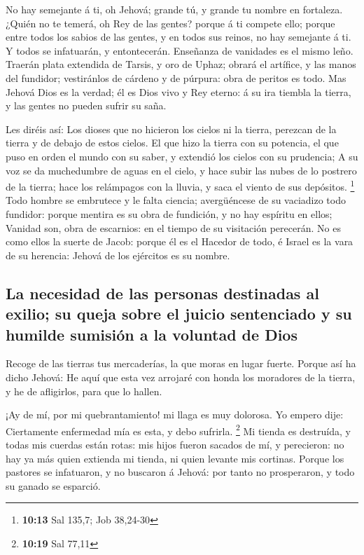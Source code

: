  No hay semejante á ti, oh Jehová; grande tú, y grande tu
nombre en fortaleza.  ¿Quién no te temerá, oh Rey de las
gentes? porque á ti compete ello; porque entre todos los sabios de las
gentes, y en todos sus reinos, no hay semejante á ti.  Y
todos se infatuarán, y entontecerán. Enseñanza de vanidades es el mismo
leño.  Traerán plata extendida de Tarsis, y oro de Uphaz;
obrará el artífice, y las manos del fundidor; vestiránlos de cárdeno y
de púrpura: obra de peritos es todo.  Mas Jehová Dios es la
verdad; él es Dios vivo y Rey eterno: á su ira tiembla la tierra, y las
gentes no pueden sufrir su saña.

 Les diréis así: Los dioses que no hicieron los cielos ni
la tierra, perezcan de la tierra y de debajo de estos cielos.
 El que hizo la tierra con su potencia, el que puso en
orden el mundo con su saber, y extendió los cielos con su prudencia;
 A su voz se da muchedumbre de aguas en el cielo, y hace
subir las nubes de lo postrero de la tierra; hace los relámpagos con la
lluvia, y saca el viento de sus depósitos. \footnote{\textbf{10:13} Sal
  135,7; Job 38,24-30}  Todo hombre se embrutece y le falta
ciencia; avergüéncese de su vaciadizo todo fundidor: porque mentira es
su obra de fundición, y no hay espíritu en ellos;  Vanidad
son, obra de escarnios: en el tiempo de su visitación perecerán.
 No es como ellos la suerte de Jacob: porque él es el
Hacedor de todo, é Israel es la vara de su herencia: Jehová de los
ejércitos es su nombre.

\hypertarget{la-necesidad-de-las-personas-destinadas-al-exilio-su-queja-sobre-el-juicio-sentenciado-y-su-humilde-sumisiuxf3n-a-la-voluntad-de-dios}{%
\subsection{La necesidad de las personas destinadas al exilio; su queja
sobre el juicio sentenciado y su humilde sumisión a la voluntad de
Dios}\label{la-necesidad-de-las-personas-destinadas-al-exilio-su-queja-sobre-el-juicio-sentenciado-y-su-humilde-sumisiuxf3n-a-la-voluntad-de-dios}}

 Recoge de las tierras tus mercaderías, la que moras en
lugar fuerte.  Porque así ha dicho Jehová: He aquí que esta
vez arrojaré con honda los moradores de la tierra, y he de afligirlos,
para que lo hallen.

 ¡Ay de mí, por mi quebrantamiento! mi llaga es muy
dolorosa. Yo empero dije: Ciertamente enfermedad mía es esta, y debo
sufrirla. \footnote{\textbf{10:19} Sal 77,11}  Mi tienda es
destruída, y todas mis cuerdas están rotas: mis hijos fueron sacados de
mí, y perecieron: no hay ya más quien extienda mi tienda, ni quien
levante mis cortinas.  Porque los pastores se infatuaron, y
no buscaron á Jehová: por tanto no prosperaron, y todo su ganado se
esparció.

